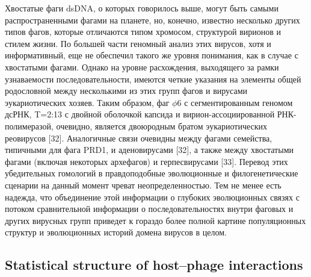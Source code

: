 \documentclass[a4paper,12pt]{article}
\begin{document}
    \par{Хвостатые фаги dsDNA, о которых говорилось выше, могут быть самыми распространенными фагами на планете, но,
    конечно, известно несколько других типов фагов, которые отличаются типом хромосом, структурой вирионов и стилем
    жизни. По большей части геномный анализ этих вирусов, хотя и информативный, еще не обеспечил такого же уровня
    понимания, как в случае с хвостатыми фагами. Однако на уровне расхождения, выходящего за рамки узнаваемости
    последовательности, имеются четкие указания на элементы общей родословной между несколькими из этих групп фагов и
    вирусами эукариотических хозяев. Таким образом, фаг $\phi$6 с сегментированным геномом дсРНК, T=2:13 с двойной
    оболочкой капсида и вирион-ассоциированной РНК-полимеразой, очевидно, является двоюродным братом эукариотических
    реовирусов [32]. Аналогичные связи очевидны между фагами семейства, типичными для фага PRD1, и аденовирусами [32],
    а также между хвостатыми фагами (включая некоторых архефагов) и герпесвирусами [33]. Перевод этих убедительных
    гомологий в правдоподобные эволюционные и филогенетические сценарии на данный момент чреват неопределенностью. Тем
    не менее есть надежда, что объединение этой информации о глубоких эволюционных связях с потоком сравнительной
    информации о последовательностях внутри фаговых и других вирусных групп приведет к гораздо более полной картине
    популяционных структур и эволюционных историй домена вирусов в целом.}
    
    \subsection{Statistical structure of host–phage interactions \cite{structure}}
    
\end{document}
